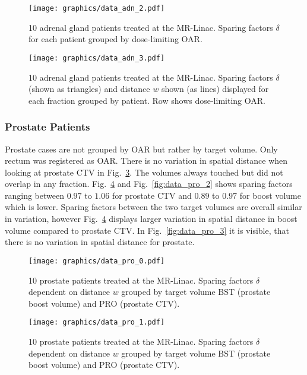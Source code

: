\documentclass[\relativeRoot/ada.tex]{subfiles}
\begin{document}
\begin{figure}[!htb]
    \centering
    \texttt{[image: graphics/data\_adn\_2.pdf]}
    \caption{10 adrenal gland patients treated at the MR-Linac. Sparing factors $\delta$ for each patient grouped by dose-limiting OAR.}
    \label{fig:data_adn_2}
\end{figure}

\begin{figure}[!htb]
    \centering
    \texttt{[image: graphics/data\_adn\_3.pdf]}
    \caption{10 adrenal gland patients treated at the MR-Linac. Sparing factors $\delta$ (shown as triangles) and distance $w$ shown (as lines) displayed for each fraction grouped by patient. Row shows dose-limiting OAR.}
    \label{fig:data_adn_3}
\end{figure}

\subsubsection{Prostate Patients}

Prostate cases are not grouped by OAR but rather by target volume. Only rectum was registered as OAR. There is no variation in spatial distance when looking at prostate CTV in Fig.~\ref{fig:data_pro_0}. The volumes always touched but did not overlap in any fraction. Fig.~\ref{fig:data_pro_1} and Fig.~\ref{fig:data_pro_2} shows sparing factors ranging between $0.97$ to $1.06$ for prostate CTV and $0.89$ to $0.97$ for boost volume which is lower. Sparing factors between the two target volumes are overall similar in variation, however Fig.~\ref{fig:data_pro_1} displays larger variation in spatial distance in boost volume compared to prostate CTV. In Fig.~\ref{fig:data_pro_3} it is visible, that there is no variation in spatial distance for prostate.

\begin{figure}[!htb]
    \centering
    \texttt{[image: graphics/data\_pro\_0.pdf]}
    \caption{10 prostate patients treated at the MR-Linac. Sparing factors $\delta$ dependent on distance $w$ grouped by target volume BST (prostate boost volume) and PRO (prostate CTV).}
    \label{fig:data_pro_0}
\end{figure}

\begin{figure}[!htb]
    \centering
    \texttt{[image: graphics/data\_pro\_1.pdf]}
    \caption{10 prostate patients treated at the MR-Linac. Sparing factors $\delta$ dependent on distance $w$ grouped by target volume BST (prostate boost volume) and PRO (prostate CTV).}
    \label{fig:data_pro_1}
\end{figure}
\end{document}
